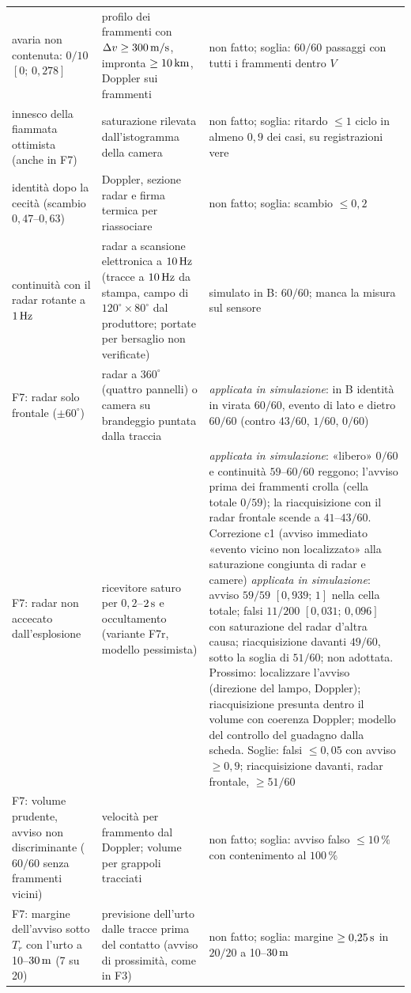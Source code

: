 {\begin{longtable}{@{}>{\RaggedRight\arraybackslash}p{3.3cm}>{\RaggedRight\arraybackslash}p{5.6cm}>{\RaggedRight\arraybackslash}p{5.8cm}@{}}
avaria non contenuta: $0/10$ $[0;\,0{,}278]$ & profilo dei frammenti con $\Delta v\ge300\,\mathrm{m/s}$, impronta $\ge10\,\mathrm{km}$, Doppler sui frammenti & non fatto; soglia: $60/60$ passaggi con tutti i frammenti dentro $V$\\
innesco della fiammata ottimista (anche in F7) & saturazione rilevata dall'istogramma della camera & non fatto; soglia: ritardo $\le1$ ciclo in almeno $0{,}9$ dei casi, su registrazioni vere\\
identità dopo la cecità (scambio $0{,}47$--$0{,}63$) & Doppler, sezione radar e firma termica per riassociare & non fatto; soglia: scambio $\le0{,}2$\\
continuità con il radar rotante a $1\,\mathrm{Hz}$ & radar a scansione elettronica a $10\,\mathrm{Hz}$ (tracce a $10\,\mathrm{Hz}$ da stampa, campo di $120^\circ\times80^\circ$ dal produttore; portate per bersaglio non verificate) & simulato in B: $60/60$; manca la misura sul sensore\\
F7: radar solo frontale ($\pm60^\circ$) & radar a $360^\circ$ (quattro pannelli) o camera su brandeggio puntata dalla traccia & \emph{applicata in simulazione}: in B identità in virata $60/60$, evento di lato e dietro $60/60$ (contro $43/60$, $1/60$, $0/60$)\\
F7: radar non accecato dall'esplosione & ricevitore saturo per $0{,}2$--$2\,\mathrm{s}$ e occultamento (variante F7r, modello pessimista) & \emph{applicata in simulazione}: «libero» $0/60$ e continuità $59$--$60/60$ reggono; l'avviso prima dei frammenti crolla (cella totale $0/59$); la riacquisizione con il radar frontale scende a $41$--$43/60$. Correzione c1 (avviso immediato «evento vicino non localizzato» alla saturazione congiunta di radar e camere) \emph{applicata in simulazione}: avviso $59/59$ $[0{,}939;\,1]$ nella cella totale; falsi $11/200$ $[0{,}031;\,0{,}096]$ con saturazione del radar d'altra causa; riacquisizione davanti $49/60$, sotto la soglia di $51/60$; non adottata. Prossimo: localizzare l'avviso (direzione del lampo, Doppler); riacquisizione presunta dentro il volume con coerenza Doppler; modello del controllo del guadagno dalla scheda. Soglie: falsi $\le0{,}05$ con avviso $\ge0{,}9$; riacquisizione davanti, radar frontale, $\ge51/60$\\
F7: volume prudente, avviso non discriminante ($60/60$ senza frammenti vicini) & velocità per frammento dal Doppler; volume per grappoli tracciati & non fatto; soglia: avviso falso $\le10\,\%$ con contenimento al $100\,\%$\\
F7: margine dell'avviso sotto $T_r$ con l'urto a 10--$30\,\mathrm{m}$ (7 su 20) & previsione dell'urto dalle tracce prima del contatto (avviso di prossimità, come in F3) & non fatto; soglia: margine $\ge0{,}25\,\mathrm{s}$ in $20/20$ a 10--$30\,\mathrm{m}$\\

\end{longtable}}
